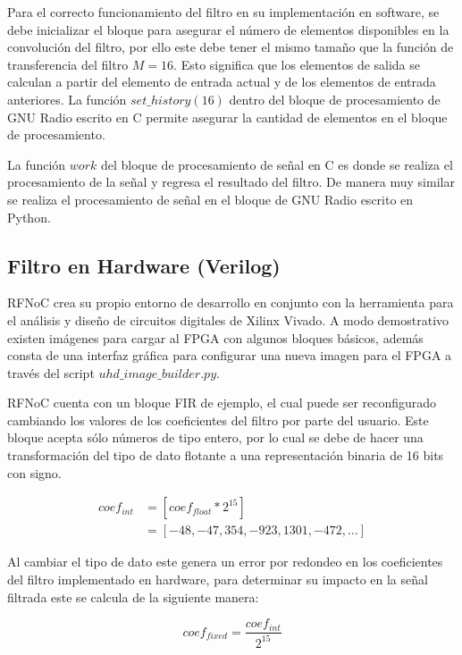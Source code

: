 \documentclass[12pt]{difu100cia} %
\begin{document}
Para el correcto funcionamiento del filtro en su implementación en software, se debe inicializar el bloque para asegurar el número de elementos disponibles en la convolución del filtro, por ello este debe tener el mismo tamaño que la función de transferencia del filtro $M=16$. Esto significa que los elementos de salida se calculan a partir del elemento de entrada actual y de los elementos de entrada anteriores. La función $set\_history(16)$ dentro del bloque de procesamiento de GNU Radio escrito en C permite asegurar la cantidad de elementos en el bloque de procesamiento.

La función $work$ del bloque de procesamiento de señal en C es donde se realiza el procesamiento de la señal y regresa el resultado del filtro. De manera muy similar se realiza el procesamiento de señal en el bloque de GNU Radio escrito en Python.

\subsection{Filtro en Hardware (Verilog)}

RFNoC crea su propio entorno de desarrollo en conjunto con la herramienta para el análisis y diseño de circuitos digitales de Xilinx Vivado. A modo demostrativo existen imágenes para cargar al FPGA con algunos bloques básicos, además consta de una interfaz gráfica para configurar una nueva imagen para el FPGA a través del script $uhd\_image\_builder.py$.  

RFNoC cuenta con un bloque FIR de ejemplo, el cual puede ser reconfigurado cambiando los valores de los coeficientes del filtro por parte del usuario. Este bloque acepta sólo números de tipo entero, por lo cual se debe de hacer una transformación del tipo de dato flotante a una representación binaria de 16 bits con signo.

\begin{equation}
\label{ec_coeffs_int} 
\begin{split}
coef_{int} & =[coef_{float}*2^{15}] \\
&  = [-48,-47,354,-923,1301,-472, \ldots]
\end{split}
\end{equation}

Al cambiar el tipo de dato este genera un error por redondeo en los coeficientes del filtro implementado en hardware, para determinar su impacto en la señal filtrada este se calcula de la siguiente manera:

\begin{equation}
    coef_{fixed}= \frac{coef_{int}}{2^{15}}
\label{ec_coeffs_fixed}  
\end{equation}
\end{document}
